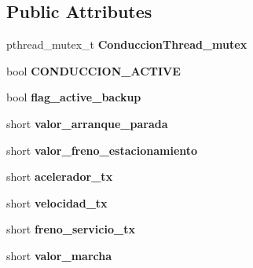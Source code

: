 \subsection*{\-Public \-Attributes}
\begin{DoxyCompactItemize}
\item 
\hypertarget{class_conduccion_thread_aaed647038c099a0ab408ccef321a2b4a}{pthread\-\_\-mutex\-\_\-t {\bfseries \-Conduccion\-Thread\-\_\-mutex}}\label{class_conduccion_thread_aaed647038c099a0ab408ccef321a2b4a}

\item 
\hypertarget{class_conduccion_thread_a403ef03e71fc3272e4825ce47c23af19}{bool {\bfseries \-C\-O\-N\-D\-U\-C\-C\-I\-O\-N\-\_\-\-A\-C\-T\-I\-V\-E}}\label{class_conduccion_thread_a403ef03e71fc3272e4825ce47c23af19}

\item 
\hypertarget{class_conduccion_thread_aa31ebdd2a99392133312f5f55388cbb2}{bool {\bfseries flag\-\_\-active\-\_\-backup}}\label{class_conduccion_thread_aa31ebdd2a99392133312f5f55388cbb2}

\item 
\hypertarget{class_conduccion_thread_ac267a2a1bef42087301ac8bf1d80cdaa}{short {\bfseries valor\-\_\-arranque\-\_\-parada}}\label{class_conduccion_thread_ac267a2a1bef42087301ac8bf1d80cdaa}

\item 
\hypertarget{class_conduccion_thread_a027aac83ca25ec528c272026bdba4744}{short {\bfseries valor\-\_\-freno\-\_\-estacionamiento}}\label{class_conduccion_thread_a027aac83ca25ec528c272026bdba4744}

\item 
\hypertarget{class_conduccion_thread_af522b2c32ac9be0c3f3cbdd90011912c}{short {\bfseries acelerador\-\_\-tx}}\label{class_conduccion_thread_af522b2c32ac9be0c3f3cbdd90011912c}

\item 
\hypertarget{class_conduccion_thread_a7fa33669ea495a7279d47b370e7318ac}{short {\bfseries velocidad\-\_\-tx}}\label{class_conduccion_thread_a7fa33669ea495a7279d47b370e7318ac}

\item 
\hypertarget{class_conduccion_thread_a7f7f4e74587782e5ee4820fc3e10ef69}{short {\bfseries freno\-\_\-servicio\-\_\-tx}}\label{class_conduccion_thread_a7f7f4e74587782e5ee4820fc3e10ef69}

\item 
\hypertarget{class_conduccion_thread_a53c06f8afb12b02c90161cf79bee3832}{short {\bfseries valor\-\_\-marcha}}\label{class_conduccion_thread_a53c06f8afb12b02c90161cf79bee3832}


\end{DoxyCompactItemize}

